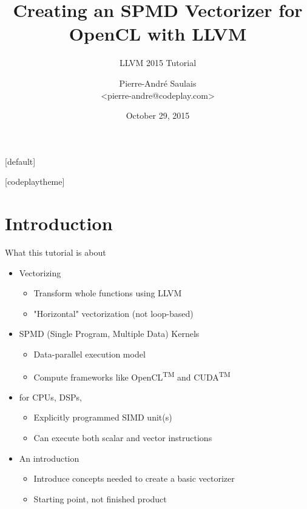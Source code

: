 \documentclass[t,aspectratio=169]{beamer}
\title{Creating an SPMD Vectorizer for OpenCL with LLVM}
\subtitle{LLVM 2015 Tutorial}
\author{Pierre-André Saulais \\ <pierre-andre@codeplay.com>}
\institute{Codeplay Software \\ @codeplaysoft}
\date{October 29, 2015}
\begin{document}
[default]

\begin{frame}
  \vspace{4ex}
  \titlepage
\end{frame}


[codeplaytheme]

\section*{Introduction}

\begin{frame}{What this tutorial is about}

\begin{minipage}[t]{0.70\linewidth}

\begin{itemize}  
    \item Vectorizing
    \begin{itemize}
        \item Transform whole functions using LLVM
        \item "Horizontal" vectorization (not loop-based)
    \end{itemize}  
    \item SPMD (Single Program, Multiple Data) Kernels
    \begin{itemize}
        \item Data-parallel execution model
        \item Compute frameworks like OpenCL\textsuperscript{TM} and CUDA\textsuperscript{TM}
    \end{itemize}
    \item for CPUs, DSPs,
    \begin{itemize}
        \item Explicitly programmed SIMD unit(s)
        \item Can execute both scalar and vector instructions
    \end{itemize}
    \item An introduction
    \begin{itemize}
        \item Introduce concepts needed to create a basic vectorizer
        \item Starting point, not finished product
    \end{itemize}
\end{itemize}


\end{minipage}
\end{frame}
\end{document}

